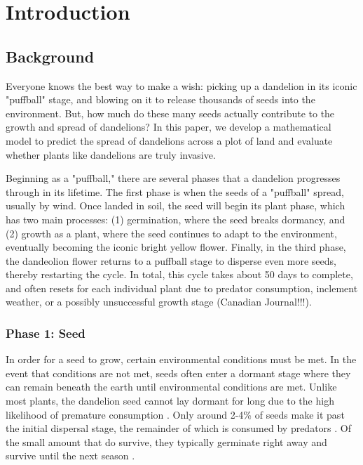 \section{Introduction}

\subsection{Background}
Everyone knows the best way to make a wish: picking up a dandelion in its iconic "puffball" stage, and blowing on it to release thousands of seeds into the environment. But, how much do these many seeds actually contribute to the growth and spread of dandelions? In this paper, we develop a mathematical model to predict the spread of dandelions across a plot of land and evaluate whether plants like dandelions are truly invasive.

Beginning as a "puffball," there are several phases that a dandelion progresses through in its lifetime. The first phase is when the seeds of a "puffball" spread, usually by wind. Once landed in soil, the seed will begin its plant phase, which has two main processes: (1) germination, where the seed breaks dormancy, and (2) growth as a plant, where the seed continues to adapt to the environment, eventually becoming the iconic bright yellow flower. Finally, in the third phase, the dandeolion flower returns to a puffball stage to disperse even more seeds, thereby restarting the cycle. In total, this cycle takes about 50 days to complete, and often resets for each individual plant due to predator consumption, inclement weather, or a possibly unsuccessful growth stage (Canadian Journal!!!).

\subsubsection{Phase 1: Seed}
In order for a seed to grow, certain environmental conditions must be met. In the event that conditions are not met, seeds often enter a dormant stage where they can remain beneath the earth until environmental conditions are met. Unlike most plants, the dandelion seed cannot lay dormant for long due to the high likelihood of premature consumption \cite{noauthor_dandelion_nodate-2}. Only around 2-4\% of seeds make it past the initial dispersal stage, the remainder of which is consumed by predators \cite{noauthor_dandelion_nodate-2}. Of the small amount that do survive, they typically germinate right away and survive until the next season \cite{noauthor_dandelion_nodate-2}.

